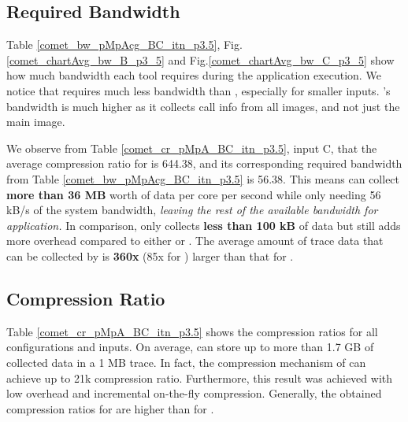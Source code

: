   
\subsection{Required Bandwidth}
\label{subsec:lowbw}



Table \ref{comet_bw_pMpAcg_BC_itn_p3.5}, Fig.  \ref{comet_chartAvg_bw_B_p3_5} and Fig.\ref{comet_chartAvg_bw_C_p3_5} show how much bandwidth each tool 
requires
during the application execution. 
%
We notice that \parlotm requires much less bandwidth than
\callgrind, especially for smaller inputs. 
%
\parlota's bandwidth is much higher as it collects call info from all
images, and not just the main image.


We observe from Table \ref{comet_cr_pMpA_BC_itn_p3.5}, input C, that the
average compression ratio for \parlota is 644.38, and its
corresponding required bandwidth from Table
\ref{comet_bw_pMpAcg_BC_itn_p3.5} is 56.38.
%
This means \parlot can
collect \textbf{more than 36 MB} worth of data per core per second
while only needing 56 kB/s of the system bandwidth, {\em leaving the rest of the available bandwidth for application.}
%
In comparison, \callgrind only
collects \textbf{less than 100 kB} of data but still adds more
overhead compared to either \parlota or \parlotm . 
%
The average amount of trace data that can be collected by \parlota is
\textbf{360x} (85x for \parlotm) larger than that for \callgrind.
%









  
\subsection{Compression Ratio}
\label{subsec:cr}

Table \ref{comet_cr_pMpA_BC_itn_p3.5} shows the compression ratios for all configurations and inputs. 
On average, \parlot can store up to more than 1.7 GB of collected data in a 1 MB trace. 
In fact, the compression mechanism of
\parlot can achieve up to 21k compression ratio.
%
Furthermore, this result was achieved with low overhead and incremental  
on-the-fly compression.
%
Generally, the obtained
compression ratios for \parlotm are higher than for \parlota. 
%
  
